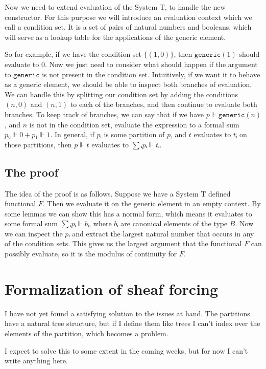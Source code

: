 \documentclass{article}
\def\generic{\texttt{generic}}
\begin{document}
Now we need to extend evaluation of the System T, to handle the new constructor.
For this purpose we will introduce an evaluation context which we call a
condition set. It is a set of pairs of natural numbers and booleans, which will
serve as a lookup table for the applications of the generic element.

So for example, if we have the condition set \(\{(1, 0)\}\), then
\(\generic(1)\) should evaluate to \(0\). Now we just need to consider what should
happen if the argument to \(\generic\) is not present in the condition set.
Intuitively, if we want it to behave as a generic element, we should be able to
inspect both branches of evaluation. We can handle this by splitting our
condition set by adding the conditions \((n, 0)\) and \((n, 1)\) to each of the
branches, and then continue to evaluate both branches. To keep track of
branches, we can say that if we have \(p ⊩ \generic(n)\), and \(n\) is not in the
condition set, evaluate the expression to a formal sum \(p₀ ⊩ 0 + p₁ ⊩ 1\).
In general, if \(pᵢ\) is some partition of \(p\), and \(t\) evaluates to \(tᵢ\)
on those partitions, then \(p ⊩ t\) evaluates to \(∑ᵢ pᵢ ⊩ tᵢ\).

\subsection{The proof}
The idea of the proof is as follows.
Suppose we have a System T defined functional \(F\). Then we evaluate it on the
generic element in an empty context. By some lemmas we can show this has a
normal form, which means it evaluates to some formal sum \(∑ᵢ pᵢ ⊩ bᵢ\), where
\(bᵢ\) are canonical elements of the type \(B\). Now we can inspect the \(pᵢ\)
and extract the largest natural number that occurs in any of the condition sets.
This gives us the largest argument that the functional \(F\) can possibly
evaluate, so it is the modulus of continuity for \(F\).

\section{Formalization of sheaf forcing}

I have not yet found a satisfying solution to the issues at hand.
The partitions have a natural tree structure, but if I define them like trees I
can't index over the elements of the partition, which becomes a problem.

I expect to solve this to some extent in the coming weeks, but for now I can't
write anything here.
\end{document}
